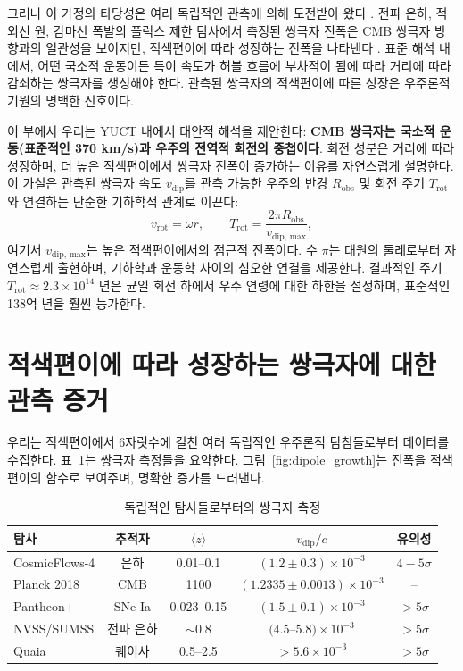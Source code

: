 \documentclass[11pt,a4paper]{article}
\begin{document}
	그러나 이 가정의 타당성은 여러 독립적인 관측에 의해 도전받아 왔다 \cite{Gibelyou2012, Yoon2014}. 전파 은하, 적외선 원, 감마선 폭발의 플럭스 제한 탐사에서 측정된 쌍극자 진폭은 CMB 쌍극자 방향과의 일관성을 보이지만, 적색편이에 따라 성장하는 진폭을 나타낸다 \cite{Bengaly2017, Siewert2021, Colin2017, Secrest2025}. 표준 해석 내에서, 어떤 국소적 운동이든 특이 속도가 허블 흐름에 부차적이 됨에 따라 거리에 따라 감쇠하는 쌍극자를 생성해야 한다. 관측된 쌍극자의 적색편이에 따른 성장은 우주론적 기원의 명백한 신호이다.
	
	이 부에서 우리는 YUCT 내에서 대안적 해석을 제안한다: \textbf{CMB 쌍극자는 국소적 운동(표준적인 370 km/s)과 우주의 전역적 회전의 중첩이다}. 회전 성분은 거리에 따라 성장하며, 더 높은 적색편이에서 쌍극자 진폭이 증가하는 이유를 자연스럽게 설명한다. 이 가설은 관측된 쌍극자 속도 \(v_{\text{dip}}\)를 관측 가능한 우주의 반경 \(R_{\text{obs}}\) 및 회전 주기 \(T_{\text{rot}}\)와 연결하는 단순한 기하학적 관계로 이끈다:
	\begin{equation}
		v_{\text{rot}} = \omega r, \qquad T_{\text{rot}} = \frac{2\pi R_{\text{obs}}}{v_{\text{dip, max}}},
	\end{equation}
	여기서 \(v_{\text{dip, max}}\)는 높은 적색편이에서의 점근적 진폭이다. 수 \(\pi\)는 대원의 둘레로부터 자연스럽게 출현하며, 기하학과 운동학 사이의 심오한 연결을 제공한다. 결과적인 주기 \(T_{\text{rot}} \approx 2.3 \times 10^{14}\) 년은 균일 회전 하에서 우주 연령에 대한 하한을 설정하며, 표준적인 138억 년을 훨씬 능가한다.
	
	\section{적색편이에 따라 성장하는 쌍극자에 대한 관측 증거}
	
	우리는 적색편이에서 6자릿수에 걸친 여러 독립적인 우주론적 탐침들로부터 데이터를 수집한다. 표~\ref{tab:dipoles}는 쌍극자 측정들을 요약한다. 그림~\ref{fig:dipole_growth}는 진폭을 적색편이의 함수로 보여주며, 명확한 증가를 드러낸다.
	
	\begin{table}[htbp]
		\centering
		\caption{독립적인 탐사들로부터의 쌍극자 측정}
		\label{tab:dipoles}
		\begin{tabular}{lcccc}
			\toprule
			\textbf{탐사} & \textbf{추적자} & \(\langle z \rangle\) & \(v_{\text{dip}}/c\) & \textbf{유의성} \\
			\midrule
			CosmicFlows-4 \cite{Watkins2023} & 은하 & 0.01--0.1 & \((1.2 \pm 0.3) \times 10^{-3}\) & \(4-5\sigma\) \\
			Planck 2018 \cite{Planck2018VII} & CMB & 1100 & \((1.2335 \pm 0.0013) \times 10^{-3}\) & -- \\
			Pantheon+ \cite{Sah2025} & SNe Ia & 0.023--0.15 & \((1.5 \pm 0.1) \times 10^{-3}\) & \(>5\sigma\) \\
			NVSS/SUMSS \cite{Colin2017} & 전파 은하 & \(\sim0.8\) & \((4.5\)--\(5.8) \times 10^{-3}\) & \(>5\sigma\) \\
			Quaia \cite{Secrest2025} & 퀘이사 & 0.5--2.5 & \(>5.6 \times 10^{-3}\) & \(>5\sigma\) \\
			\bottomrule
		\end{tabular}
	\end{table}
	
\end{document}
